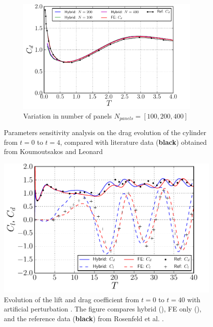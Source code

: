 \begin{figure}[!p]
     \begin{subfigure}[b]{0.49\textwidth}
             \includegraphics[width=\textwidth]{./figures/validation/isc/hybrid_ISC_drag_nPanel.pdf}
             \caption{Variation in number of panels $N_{panels} = [100,200,400]$}
             \label{fig:hybrid_ISC_drag_nPanelComparison}
	 \end{subfigure}
    
     \caption{Parameters sensitivity analysis on the drag evolution of the cylinder from $t=0$ to $t=4$, compared with literature data (\textbf{black}) obtained from Koumoutsakos and Leonard \cite{Koumoutsakos1995a}}
     \label{fig:hybrid_ISC_parameterSensitivity}
	\end{figure}
	

	\begin{figure}[!p]
	\centering
	\includegraphics[width=0.6\linewidth]{./figures/validation/isc/hybrid_cylinder_LongRun_liftDrag_fixed.pdf}
	\caption{Evolution of the lift and drag coefficient from $t=0$ to $t=40$ with artificial perturbation \cite{Lecointe1984}. The figure compares hybrid ({}), FE only ({}), and the reference data (\textbf{black}) from Rosenfeld et al. \cite{MosheRosenFeldDochanKwak1991}.}
	\label{fig:hybrid_cylinder_LongRun_liftDrag}
	\end{figure}	


